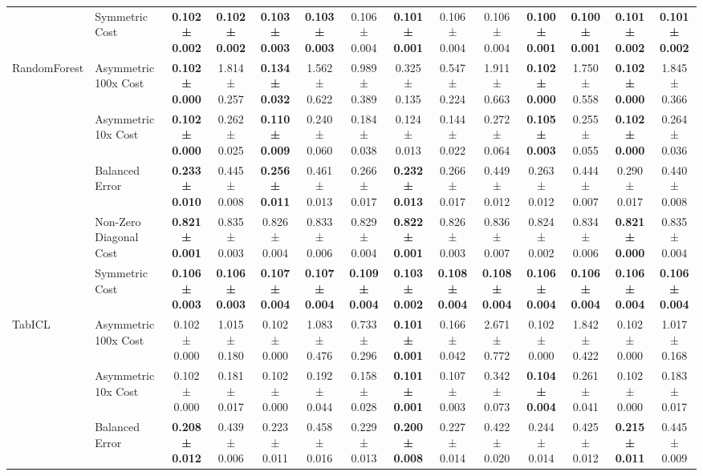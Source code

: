 \begin{table}[H]
{\begin{tabular}{llcccccccccccc}
 & Symmetric Cost & \textbf{0.102 ± 0.002} & \textbf{0.102 ± 0.002} & \textbf{0.103 ± 0.003} & \textbf{0.103 ± 0.003} & 0.106 ± 0.004 & \textbf{0.101 ± 0.001} & 0.106 ± 0.004 & 0.106 ± 0.004 & \textbf{0.100 ± 0.001} & \textbf{0.100 ± 0.001} & \textbf{0.101 ± 0.002} & \textbf{0.101 ± 0.002} \\
\cline{1-14}
\multirow[t]{5}{*}{RandomForest} & Asymmetric 100x Cost & \textbf{0.102 ± 0.000} & 1.814 ± 0.257 & \textbf{0.134 ± 0.032} & 1.562 ± 0.622 & 0.989 ± 0.389 & 0.325 ± 0.135 & 0.547 ± 0.224 & 1.911 ± 0.663 & \textbf{0.102 ± 0.000} & 1.750 ± 0.558 & \textbf{0.102 ± 0.000} & 1.845 ± 0.366 \\
 & Asymmetric 10x Cost & \textbf{0.102 ± 0.000} & 0.262 ± 0.025 & \textbf{0.110 ± 0.009} & 0.240 ± 0.060 & 0.184 ± 0.038 & 0.124 ± 0.013 & 0.144 ± 0.022 & 0.272 ± 0.064 & \textbf{0.105 ± 0.003} & 0.255 ± 0.055 & \textbf{0.102 ± 0.000} & 0.264 ± 0.036 \\
 & Balanced Error & \textbf{0.233 ± 0.010} & 0.445 ± 0.008 & \textbf{0.256 ± 0.011} & 0.461 ± 0.013 & 0.266 ± 0.017 & \textbf{0.232 ± 0.013} & 0.266 ± 0.017 & 0.449 ± 0.012 & 0.263 ± 0.012 & 0.444 ± 0.007 & 0.290 ± 0.017 & 0.440 ± 0.008 \\
 & Non-Zero Diagonal Cost & \textbf{0.821 ± 0.001} & 0.835 ± 0.003 & 0.826 ± 0.004 & 0.833 ± 0.006 & 0.829 ± 0.004 & \textbf{0.822 ± 0.001} & 0.826 ± 0.003 & 0.836 ± 0.007 & 0.824 ± 0.002 & 0.834 ± 0.006 & \textbf{0.821 ± 0.000} & 0.835 ± 0.004 \\
 & Symmetric Cost & \textbf{0.106 ± 0.003} & \textbf{0.106 ± 0.003} & \textbf{0.107 ± 0.004} & \textbf{0.107 ± 0.004} & \textbf{0.109 ± 0.004} & \textbf{0.103 ± 0.002} & \textbf{0.108 ± 0.004} & \textbf{0.108 ± 0.004} & \textbf{0.106 ± 0.004} & \textbf{0.106 ± 0.004} & \textbf{0.106 ± 0.004} & \textbf{0.106 ± 0.004} \\
\cline{1-14}
\multirow[t]{5}{*}{TabICL} & Asymmetric 100x Cost & 0.102 ± 0.000 & 1.015 ± 0.180 & 0.102 ± 0.000 & 1.083 ± 0.476 & 0.733 ± 0.296 & \textbf{0.101 ± 0.001} & 0.166 ± 0.042 & 2.671 ± 0.772 & 0.102 ± 0.000 & 1.842 ± 0.422 & 0.102 ± 0.000 & 1.017 ± 0.168 \\
 & Asymmetric 10x Cost & 0.102 ± 0.000 & 0.181 ± 0.017 & 0.102 ± 0.000 & 0.192 ± 0.044 & 0.158 ± 0.028 & \textbf{0.101 ± 0.001} & 0.107 ± 0.003 & 0.342 ± 0.073 & \textbf{0.104 ± 0.004} & 0.261 ± 0.041 & 0.102 ± 0.000 & 0.183 ± 0.017 \\
 & Balanced Error & \textbf{0.208 ± 0.012} & 0.439 ± 0.006 & 0.223 ± 0.011 & 0.458 ± 0.016 & 0.229 ± 0.013 & \textbf{0.200 ± 0.008} & 0.227 ± 0.014 & 0.422 ± 0.020 & 0.244 ± 0.014 & 0.425 ± 0.012 & \textbf{0.215 ± 0.011} & 0.445 ± 0.009 \\

\end{tabular}}
\end{table}
